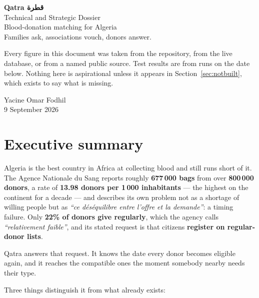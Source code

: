 \documentclass[11pt,a4paper]{article}
\newcommand{\ar}[1]{\textarabic{#1}}
\begin{document}
\begin{titlepage}
\centering
\vspace*{3cm}
{\Huge\bfseries\color{qatraNavy} Qatra \ar{قطرة}}\\[0.5em]
{\Large\color{qatraRed} Technical and Strategic Dossier}\\[2em]
{\large Blood-donation matching for Algeria}\\[0.4em]
{\color{qatraGrey} Families ask, associations vouch, donors answer.}\\[3em]

\begin{minipage}{0.8\textwidth}
\centering\small\color{qatraGrey}
Every figure in this document was taken from the repository, from the live
database, or from a named public source. Test results are from runs on the
date below. Nothing here is aspirational unless it appears in
Section~\ref{sec:notbuilt}, which exists to say what is missing.
\end{minipage}

\vfill
{\color{qatraGrey}Yacine Omar Fodhil \\ 9 September 2026}
\end{titlepage}

\tableofcontents
\newpage

\section{Executive summary}

Algeria is the best country in Africa at collecting blood and still runs short
of it. The Agence Nationale du Sang reports roughly \textbf{677\,000 bags} from
over \textbf{800\,000 donors}, a rate of \textbf{13.98 donors per 1\,000
inhabitants} — the highest on the continent for a decade — and describes its own
problem not as a shortage of willing people but as
\emph{``ce déséquilibre entre l'offre et la demande''}: a timing failure. Only
\textbf{22\% of donors give regularly}, which the agency calls
\emph{``relativement faible''}, and its stated request is that citizens
\textbf{register on regular-donor lists}.

Qatra answers that request. It knows the date every donor becomes eligible
again, and it reaches the compatible ones the moment somebody nearby needs
their type.

Three things distinguish it from what already exists:
\end{document}
